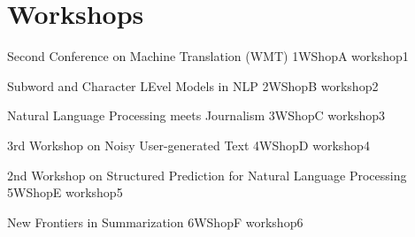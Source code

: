 \chapter[Workshops: \daydate]{Workshops}
\thispagestyle{emptyheader}
\vfill




\clearpage
{}

\begin{wsschedule}
  {Second Conference on Machine Translation (WMT)}
  {1}{WShopA}
  {workshop1}
  {\WShopLocA}
  
\end{wsschedule}
        


\begin{wsschedule}
  {Subword and Character LEvel Models in NLP}
  {2}{WShopB}
  {workshop2}
  {\WShopLocB}
  
\end{wsschedule}

\begin{wsschedule}
  {Natural Language Processing meets Journalism}
  {3}{WShopC}
  {workshop3}
  {\WShopLocC}
  \clearpage
\end{wsschedule}

\begin{wsschedule}
  {3rd Workshop on Noisy User-generated Text}
  {4}{WShopD}
  {workshop4}
  {\WShopLocD}
  
\end{wsschedule}

\begin{wsschedule}
  {2nd Workshop on Structured Prediction for Natural Language Processing}
  {5}{WShopE}
  {workshop5}
  {\WShopLocE}
  
\end{wsschedule}

\begin{wsschedule}
  {New Frontiers in Summarization}
  {6}{WShopF}
  {workshop6}
  {\WShopLocF}
  
\end{wsschedule}

